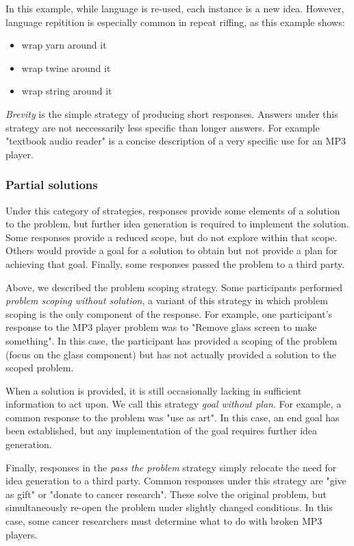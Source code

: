 In this example, while language is re-used, each instance is a new idea.
However, language repitition is especially common in repeat riffing, as this example shows:

\begin{itemize}
    \item wrap yarn around it
    \item wrap twine around it
    \item wrap string around it
\end{itemize}

\emph{Brevity} is the simple strategy of producing short responses. Answers under this strategy are not neccessarily less specific than longer answers. For example "textbook audio reader" is a concise description of a very specific use for an MP3 player.

\subsubsection{Partial solutions}

Under this category of strategies, responses provide some elements of a solution to the problem, but further idea generation is required to implement the solution. Some responses provide a reduced scope, but do not explore within that scope. Others would provide a goal for a solution to obtain but not provide a plan for achieving that goal. Finally, some responses passed the problem to a third party.

Above, we described the problem scoping strategy. Some participants performed \emph{problem scoping without solution}, a variant of this strategy in which problem scoping is the only component of the response.
For example, one participant's response to the MP3 player problem was to "Remove glass screen to make something". In this case, the participant has provided a scoping of the problem (focus on the glass component) but has not actually provided a solution to the scoped problem.

When a solution is provided, it is still occasionally lacking in sufficient information to act upon. We call this strategy \emph{goal without plan}. For example, a common response to the problem was "use as art". In this case, an end goal has been established, but any implementation of the goal requires further idea generation.

Finally, responses in the \emph{pass the problem} strategy simply relocate the need for idea generation to a third party. Common responses under this strategy are "give as gift" or "donate to cancer research". These solve the original problem, but simultaneously re-open the problem under slightly changed conditions. In this case, some cancer researchers must determine what to do with broken MP3 players.

